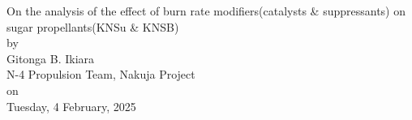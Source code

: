 \documentclass[12pt,letterpaper]{article}
\begin{document}
	\begin{center}
		\huge{On the analysis of the effect of burn rate modifiers(catalysts \& suppressants) on sugar propellants(KNSu \& KNSB)} \\
		by \\
		\Large{Gitonga B. Ikiara} \\
		\large{N-4 Propulsion Team, Nakuja Project} \\
		on \\
		\large{Tuesday, 4 February, 2025} \\
	\end{center}

	
	
	
	
	\appendix
	
\end{document}
